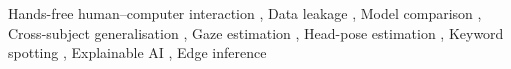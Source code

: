 \documentclass[a4paper,fleqn]{cas-sc}
\begin{document}
\begin{keywords}
Hands-free human--computer interaction \sep
Data leakage \sep
Model comparison \sep
Cross-subject generalisation \sep
Gaze estimation \sep
Head-pose estimation \sep
Keyword spotting \sep
Explainable AI \sep
Edge inference
\end{keywords}

\maketitle










\printcredits



\end{document}
